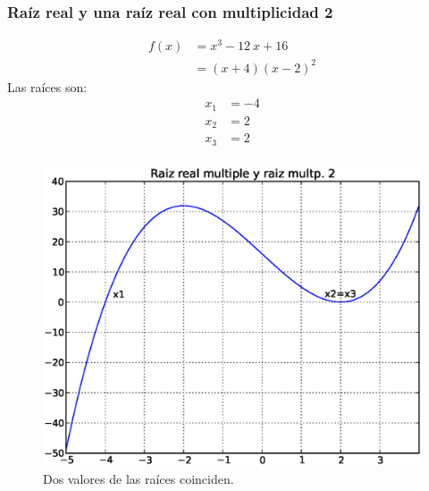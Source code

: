 \begin{frame}[fragile]
\captionsetup{justification=centering}
\frametitle{Raíz real y una raíz real con multiplicidad 2}
\begin{minipage}{5cm}
\fontsize{12}{12}\selectfont
\begin{align*}
f(x) &= x^{3} - 12 \: x + 16 \\
&= (x + 4)(x - 2)^{2}
\end{align*}
Las raíces son:
\begin{align*}
x_{1} &= -4 \\
x_{2} &= 2 \\
x_{3} &= 2 \\
\end{align*}
\end{minipage}
\hspace{0.5cm}
\begin{minipage}{4.5cm}
\begin{figure}
	\centering
	\includegraphics[scale=0.3]{Imagenes/raices03.eps} 
	\caption{Dos valores de las raíces coinciden.}
\end{figure}
\end{minipage}
\end{frame}
